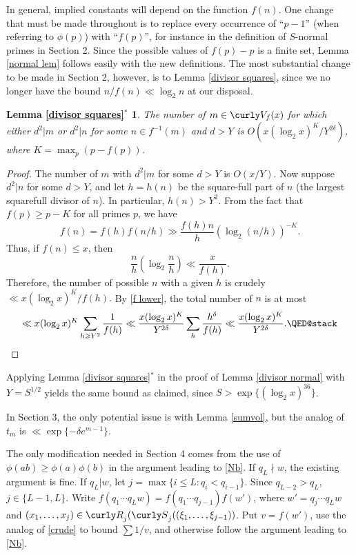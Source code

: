 \documentclass[11pt]{amsart}
\theoremstyle{remark}
\theoremstyle{plain}
\numberwithin{equation}{section}
\newcommand{\del}{\ensuremath{\delta}}
\renewcommand{\(}{\left(}
\renewcommand{\)}{\right)}
\newcommand{\fancyS}{{\curly S}}
\newcommand{\fancyV}{\curly V}
\renewcommand{\le}{\leqslant}
\renewcommand{\ge}{\geqslant}
\begin{document}
In general, implied constants will depend on the function $f(n)$.
One change that must be made throughout is to replace every occurrence
of ``$p-1$'' (when referring to $\phi(p)$) with ``$f(p)$'',
for instance in the definition
of $S$-normal primes in Section 2.  Since the possible values of $f(p)-p$
is a finite set, Lemma \ref{normal lem} follows easily
with the new definitions.  The most substantial change to be made in
Section 2, however, is to Lemma \ref{divisor squares}, since we no longer
have the bound $n/f(n) \ll \log_2 n$ at our disposal.

\newtheorem*{lemds*}{Lemma \ref{divisor squares}$^*$}
\begin{lemds*}
  The
number of $m \in \fancyV_f(x)$ for which either
$d^2|m$ or $d^2|n$ for some $n \in f^{-1}(m)$ and  $d>Y$
is $O(x(\log_2 x)^K/Y^{2\del})$, where $K=\max_p (p-f(p))$.
\end{lemds*}

\begin{proof}
The number of $m$ with $d^2|m$ for some $d>Y$ is $O(x/Y)$.  Now suppose $d^2|n$
for some $d>Y$, and let $h=h(n)$ be the square-full part of $n$ (the largest squarefull
divisor of $n$).
In particular, $h(n)>Y^2$.  From the fact that $f(p)\ge p-K$ for all primes $p$,
we have
$$
f(n) = f(h) f(n/h) \gg \frac{f(h) n}{h} (\log_2 (n/h))^{-K}.
$$
Thus, if $f(n)\le x$, then
$$
\frac{n}{h} \( \log_2 \frac{n}{h} \) \ll \frac{x}{f(h)}.
$$
Therefore, the number of possible $n$ with a given $h$ is crudely
$\ll x(\log_2 x)^K/f(h).$
By \eqref{f lower}, the total number of $n$ is at most
\[
\ll x(\log_2 x)^K \sum_{h\ge Y^2} \frac{1}{f(h)}
\ll \frac{x(\log_2 x)^K}{Y^{2\del}} \sum_{h} \frac{h^{\del}}{f(h)}
\ll \frac{x(\log_2 x)^K}{Y^{2\del}}.\qedhere
\]
\end{proof}

Applying Lemma \ref{divisor squares}$^*$ in the proof of Lemma \ref{divisor normal}
with $Y=S^{1/2}$ 
yields the same bound as claimed, since $S>\exp\{ (\log_2 x)^{36} \}$.

In Section 3, the only potential issue is with Lemma \ref{sumvol}, but
the analog of $t_m$ is $\ll \exp \{ -\del e^{m-1} \}$.

The only modification needed in Section 4 comes from 
the use of $\phi(ab)\ge \phi(a)\phi(b)$ in the
argument leading to \eqref{Nb}.  If $q_L\nmid w$, the existing argument
is fine.  If $q_L | w$, let $j=\max\{i\le L: q_i<q_{i-1} \}$.  Since
$q_{L-2}>q_{L}$, $j\in \{L-1,L\}$.  Write $f(q_1\cdots q_L w)=f(q_1\cdots q_{j-1})
f(w')$, where $w'=q_j\cdots q_L w$ and $(x_1,\ldots,x_j)\in{\curly R}_j(\fancyS_j((\xi_1,\ldots, \xi_{j-1}))$.  Put $v=f(w')$, use the analog of \eqref{crude} to bound $\sum 1/v$, and otherwise follow the argument leading to
\eqref{Nb}.
\end{document}
